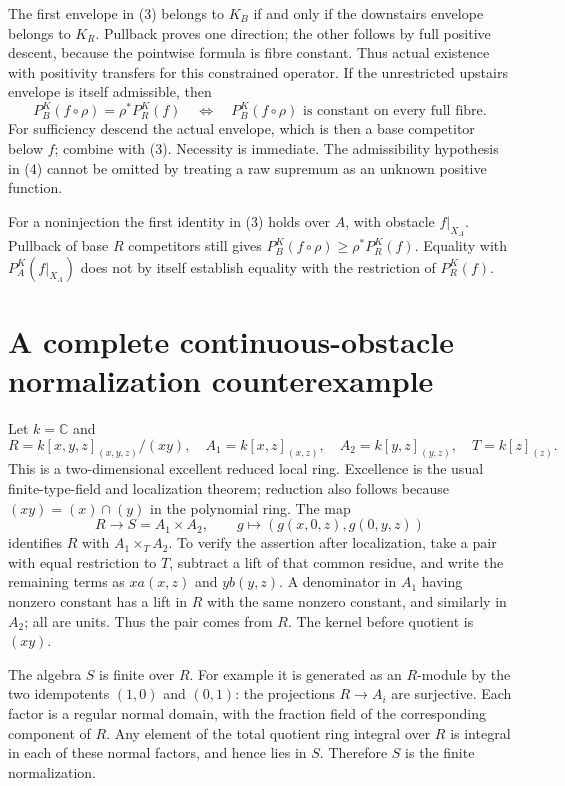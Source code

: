 \documentclass[11pt]{article}
\begin{document}
The first envelope in (3) belongs to \(K_B\) if and only if the
downstairs envelope belongs to \(K_R\). Pullback proves one direction;
the other follows by full positive descent, because the pointwise
formula is fibre constant. Thus actual existence with positivity
transfers for this constrained operator.
If the unrestricted upstairs envelope is itself admissible, then
\[
 P_B^K(f\circ\rho)=\rho^*P_R^K(f)
 \quad\Longleftrightarrow\quad
 P_B^K(f\circ\rho)\text{ is constant on every full fibre}.        \tag{4}
\]
For sufficiency descend the actual envelope, which is then a base
competitor below \(f\); combine with (3). Necessity is immediate.
The admissibility hypothesis in (4) cannot be omitted by treating a
raw supremum as an unknown positive function.

For a noninjection the first identity in (3) holds over \(A\),
with obstacle \(f|_{X_A}\). Pullback of base \(R\) competitors
still gives \(P_B^K(f\circ\rho)\geq\rho^*P_R^K(f)\).
Equality with \(P_A^K(f|_{X_A})\) does not by itself establish
equality with the restriction of \(P_R^K(f)\).

\section{A complete continuous-obstacle normalization counterexample}
\label{sec:counter}
Let \(k=\mathbb C\) and
\[
 R=k[x,y,z]_{(x,y,z)}/(xy),\quad
 A_1=k[x,z]_{(x,z)},\quad A_2=k[y,z]_{(y,z)},\quad
 T=k[z]_{(z)}.
                                                               \tag{5}
\]
This is a two-dimensional excellent reduced local ring. Excellence
is the usual finite-type-field and localization theorem; reduction
also follows because \((xy)=(x)\cap(y)\) in the polynomial ring.
The map
\[
 R\longrightarrow S=A_1\times A_2,\qquad
 g\longmapsto(g(x,0,z),g(0,y,z))
                                                               \tag{6}
\]
identifies \(R\) with \(A_1\times_T A_2\).
To verify the assertion after localization, take a pair with equal
restriction to \(T\), subtract a lift of that common residue, and
write the remaining terms as \(xa(x,z)\) and \(yb(y,z)\).
A denominator in \(A_1\) having nonzero constant has a lift in \(R\)
with the same nonzero constant, and similarly in \(A_2\); all are
units. Thus the pair comes from \(R\). The kernel before quotient is
\((xy)\).

The algebra \(S\) is finite over \(R\). For example it is generated
as an \(R\)-module by the two idempotents \((1,0)\) and \((0,1)\):
the projections \(R\to A_i\) are surjective.
Each factor is a regular normal domain, with the fraction field of
the corresponding component of \(R\). Any element of the total
quotient ring integral over \(R\) is integral in each of these normal
factors, and hence lies in \(S\). Therefore \(S\) is the finite
normalization.
\end{document}
